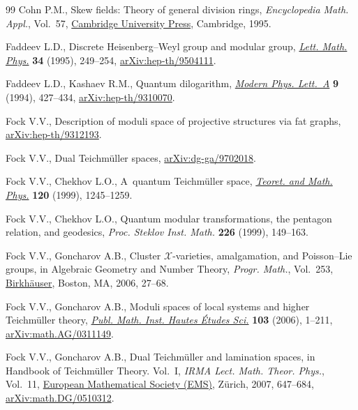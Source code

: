\documentclass[10pt,a4paper]{amsart}
\numberwithin{equation}{section}
\theoremstyle{definition}
\begin{document}
\begin{thebibliography}{99}
Cohn P.M., Skew fields: {T}heory of general division rings,
 \textit{Encyclopedia Math. Appl.}, Vol.~57,
 \href{https://doi.org/10.1017/CBO9781139087193}{Cambridge University Press},
 Cambridge, 1995.

Faddeev L.D., Discrete {H}eisenberg--{W}eyl group and modular group,
 \href{https://doi.org/10.1007/BF01872779}{\textit{Lett. Math. Phys.}}
 \textbf{34} (1995), 249--254,
 \href{http://arxiv.org/abs/hep-th/9504111}{arXiv:hep-th/9504111}.

Faddeev L.D., Kashaev R.M., Quantum dilogarithm,
 \href{https://doi.org/10.1142/S0217732394000447}{\textit{Modern Phys.
 Lett.~A}} \textbf{9} (1994), 427--434,
 \href{http://arxiv.org/abs/hep-th/9310070}{arXiv:hep-th/9310070}.

Fock V.V., Description of moduli space of projective structures via fat graphs,
 \href{http://arxiv.org/abs/hep-th/9312193}{arXiv:hep-th/9312193}.

Fock V.V., Dual {T}eichm\"{u}ller spaces,
 \href{http://arxiv.org/abs/dg-ga/9702018}{arXiv:dg-ga/9702018}.

Fock V.V., Chekhov L.O., A~quantum {T}eichm\"{u}ller space,
 \href{https://doi.org/10.1007/BF02557246}{\textit{Teoret. and Math. Phys.}}
 \textbf{120} (1999), 1245--1259.

Fock V.V., Chekhov L.O., Quantum modular transformations, the pentagon
 relation, and geodesics, \textit{Proc. Steklov Inst. Math.} \textbf{226}
 (1999), 149--163.

Fock V.V., Goncharov A.B., Cluster {$\mathscr{X}$}-varieties, amalgamation, and
 {P}oisson--{L}ie groups, in Algebraic Geometry and Number Theory,
 \textit{Progr. Math.}, Vol.~253,
 \href{https://doi.org/10.1007/978-0-8176-4532-8_2}{Birkh\"{a}user}, Boston,
 MA, 2006, 27--68.

Fock V.V., Goncharov A.B., Moduli spaces of local systems and higher
 {T}eichm\"{u}ller theory,
 \href{https://doi.org/10.1007/s10240-006-0039-4}{\textit{Publ. Math. Inst.
 Hautes \'{E}tudes Sci.}} \textbf{103} (2006), 1--211,
 \href{http://arxiv.org/abs/math.AG/0311149}{arXiv:math.AG/0311149}.

Fock V.V., Goncharov A.B., Dual {T}eichm\"{u}ller and lamination spaces, in
 Handbook of {T}eichm\"{u}ller Theory. {V}ol.~{I}, \textit{IRMA Lect. Math.
 Theor. Phys.}, Vol.~11, \href{https://doi.org/10.4171/029-1/16}{European
 Mathematical Society (EMS)}, Z\"{u}rich, 2007, 647--684,
 \href{http://arxiv.org/abs/math.DG/0510312}{arXiv:math.DG/0510312}.


\end{thebibliography}
\end{document}
